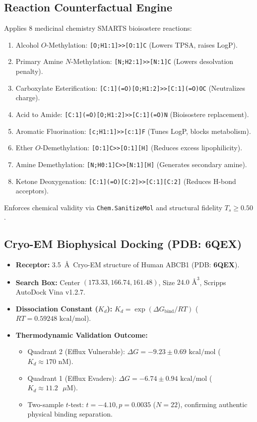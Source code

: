 \documentclass[11pt,a4paper]{article}
\begin{document}
\subsection{Reaction Counterfactual Engine}
\begin{mathspecbox}
Applies 8 medicinal chemistry SMARTS bioisostere reactions:
\begin{enumerate}[leftmargin=*]
    \item Alcohol $O$-Methylation: \texttt{[O;H1:1]>>[O:1]C} (Lowers TPSA, raises LogP).
    \item Primary Amine $N$-Methylation: \texttt{[N;H2:1]>>[N:1]C} (Lowers desolvation penalty).
    \item Carboxylate Esterification: \texttt{[C:1](=O)[O;H1:2]>>[C:1](=O)OC} (Neutralizes charge).
    \item Acid to Amide: \texttt{[C:1](=O)[O;H1:2]>>[C:1](=O)N} (Bioisostere replacement).
    \item Aromatic Fluorination: \texttt{[c;H1:1]>>[c:1]F} (Tunes LogP, blocks metabolism).
    \item Ether $O$-Demethylation: \texttt{[O:1]C>>[O:1][H]} (Reduces excess lipophilicity).
    \item Amine Demethylation: \texttt{[N;H0:1]C>>[N:1][H]} (Generates secondary amine).
    \item Ketone Deoxygenation: \texttt{[C:1](=O)[C:2]>>[C:1][C:2]} (Reduces H-bond acceptors).
\end{enumerate}
Enforces chemical validity via \texttt{Chem.SanitizeMol} and structural fidelity $T_s \ge 0.50$.
\end{mathspecbox}

\subsection{Cryo-EM Biophysical Docking (PDB: 6QEX)}
\begin{mathspecbox}
\begin{itemize}[leftmargin=*]
    \item \textbf{Receptor:} 3.5~\AA\ Cryo-EM structure of Human ABCB1 (PDB: \textbf{6QEX}).
    \item \textbf{Search Box:} Center $(173.33, 166.74, 161.48)$, Size $24.0\text{ \AA}^3$, Scripps AutoDock Vina v1.2.7.
    \item \textbf{Dissociation Constant ($K_d$):} $K_d = \exp(\Delta G_{\text{bind}} / RT)$ ($RT = 0.59248\text{ kcal/mol}$).
    \item \textbf{Thermodynamic Validation Outcome:}
    \begin{itemize}
        \item Quadrant 2 (Efflux Vulnerable): $\Delta G = -9.23 \pm 0.69\text{ kcal/mol}$ ($K_d \approx 170\text{ nM}$).
        \item Quadrant 1 (Efflux Evaders): $\Delta G = -6.74 \pm 0.94\text{ kcal/mol}$ ($K_d \approx 11.2\text{ }\mu\text{M}$).
        \item Two-sample $t$-test: $t = -4.10, p = 0.0035$ ($N = 22$), confirming authentic physical binding separation.
    \end{itemize}
\end{itemize}
\end{mathspecbox}
\end{document}
